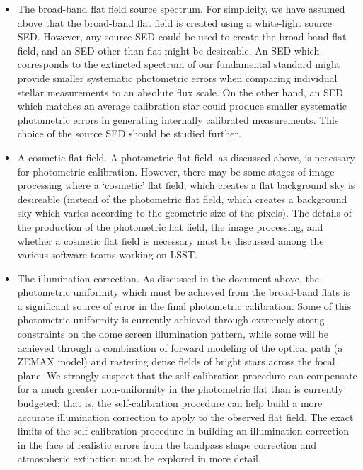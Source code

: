 \documentclass[12pt,preprint]{aastex}
\begin{document}
\begin{itemize}

\item{The broad-band flat field source spectrum. For simplicity, we have assumed above
    that the broad-band flat field is created using a white-light
    source SED. However, any source SED could be used to create the
    broad-band flat field, and an SED other than flat might be
    desireable. An SED which corresponds to the extincted
    spectrum of our fundamental standard might provide smaller systematic
    photometric errors when comparing individual stellar measurements
    to an absolute flux scale. On the other hand, an SED which matches
    an average calibration star could produce smaller systematic
    photometric errors in generating internally calibrated
    measurements. This choice of the source SED should be studied
    further. }

\item{A cosmetic flat field. A photometric flat field, as discussed above, is
    necessary for photometric calibration. However, there may be some
    stages of image processing where a `cosmetic' flat field, which
    creates a flat background sky is desireable (instead of the photometric flat
    field, which creates a background sky which varies according to
    the geometric size of the pixels). The details of the production
    of the photometric flat field, the image processing, and whether a
    cosmetic flat field is necessary must be discussed among the
    various software teams working on LSST.}

\item{The illumination correction. As discussed in the document above, the
    photometric uniformity which must be achieved from the broad-band
    flats is a significant source of error in the final photometric
    calibration. Some of this photometric uniformity is currently
    achieved through extremely strong constraints on the dome screen
    illumination pattern, while some will be achieved through a
    combination of forward modeling of the optical path (a ZEMAX
    model) and rastering dense fields of bright stars across the focal
    plane. We strongly suspect that the self-calibration procedure can
    compensate for a much greater non-uniformity in the photometric
    flat than is currently budgeted; that is, the self-calibration
    procedure can help build a more accurate illumination correction
    to apply to the observed flat field. The exact limits of the
    self-calibration procedure in building an illumination correction in the face of realistic errors from
    the bandpass shape correction and atmospheric extinction must be
    explored in more detail. }


\end{itemize}
\end{document}
